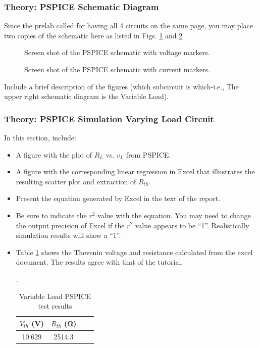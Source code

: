 \documentclass[11pt]{article}
\begin{document}
\subsubsection{Theory: PSPICE Schematic Diagram}
Since the prelab called for having all 4 circuits on the same page, you may place two copies of the schematic here as listed in Figs. \ref{Fig:SchematicVoltMarkers} and \ref{Fig:SchematicCurrentMarkers}
\begin{figure}[h]
	\centering
	\vspace{2in}
	\caption{Screen shot of the PSPICE schematic with voltage markers.}
	\label{Fig:SchematicVoltMarkers}
\end{figure} 

\begin{figure}[h]
	\centering
	\vspace{2in}
	\caption{Screen shot of the PSPICE schematic with current markers.}
	\label{Fig:SchematicCurrentMarkers}
\end{figure}
Include a brief description of the figures (which subcircuit is which-i.e., The upper right schematic diagram is the Variable Load).
\subsubsection{Theory: PSPICE Simulation Varying Load Circuit}
 In this section, include: 
 \begin{itemize}
 	\item A figure with the plot of $R_L$ vs. $v_{L}$ from PSPICE.
 	\item A figure with the corresponding linear regression in Excel that illustrates the resulting scatter plot and extraction of $R_{th}$. 
 	\item Present the equation generated by Excel in the text of the report.
 	\item Be sure to indicate the $r^2$  value with the equation. You may need to change the output precision of Excel if the $r^2$ value appears to be ``1''.  Realistically simulation results will show a ``1''.
 	\item Table \ref{Table:Lab3VariableLoadPSPICE} shows the Thevenin voltage and resistance calculated from the excel document. The results agree with that of the tutorial.
 	\begin{table}[h]
 		\centering
 		\caption{Variable Load PSPICE test results}.
 		\label{Table:Lab3VariableLoadPSPICE}
 		\begin{tabular}{|c|c|c|c|}
 			\hline
 			$V_{th}$ (\si{\volt})& %
 			 $R_{th}$ (\si{\ohm}) \\
 			\hline
 			10.629	& 2514.3 \\	 \hline 
 		\end{tabular}
 	\end{table}
 \end{itemize}
 
\end{document}
